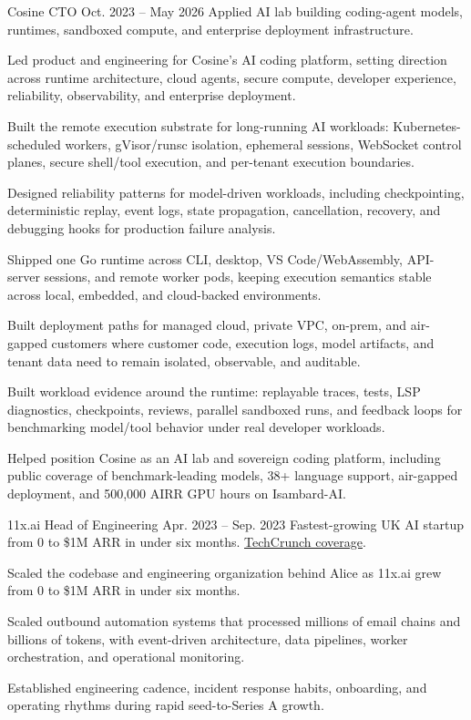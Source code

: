
\ResumeJob
  {Cosine}
  {CTO}
  {Oct. 2023 -- May 2026}
  {Applied AI lab building coding-agent models, runtimes, sandboxed compute, and enterprise deployment infrastructure.}
\begin{ResumeList}
  \item Led product and engineering for Cosine's AI coding platform, setting direction across runtime architecture, cloud agents, secure compute, developer experience, reliability, observability, and enterprise deployment.
  \item Built the remote execution substrate for long-running AI workloads: Kubernetes-scheduled workers, gVisor/runsc isolation, ephemeral sessions, WebSocket control planes, secure shell/tool execution, and per-tenant execution boundaries.
  \item Designed reliability patterns for model-driven workloads, including checkpointing, deterministic replay, event logs, state propagation, cancellation, recovery, and debugging hooks for production failure analysis.
  \item Shipped one Go runtime across CLI, desktop, VS Code/WebAssembly, API-server sessions, and remote worker pods, keeping execution semantics stable across local, embedded, and cloud-backed environments.
  \item Built deployment paths for managed cloud, private VPC, on-prem, and air-gapped customers where customer code, execution logs, model artifacts, and tenant data need to remain isolated, observable, and auditable.
  \item Built workload evidence around the runtime: replayable traces, tests, LSP diagnostics, checkpoints, reviews, parallel sandboxed runs, and feedback loops for benchmarking model/tool behavior under real developer workloads.
  \item Helped position Cosine as an AI lab and sovereign coding platform, including public coverage of benchmark-leading models, 38+ language support, air-gapped deployment, and 500,000 AIRR GPU hours on Isambard-AI.
\end{ResumeList}

\ResumeJob
  {11x.ai}
  {Head of Engineering}
  {Apr. 2023 -- Sep. 2023}
  {Fastest-growing UK AI startup from 0 to \$1M ARR in under six months. \href{https://techcrunch.com/2023/08/11/11xai-closes-2-million-pre-seed-to-create-autonomous-ai-workers/}{TechCrunch coverage}.}
\begin{ResumeList}
  \item Scaled the codebase and engineering organization behind Alice as 11x.ai grew from 0 to \$1M ARR in under six months.
  \item Scaled outbound automation systems that processed millions of email chains and billions of tokens, with event-driven architecture, data pipelines, worker orchestration, and operational monitoring.
  \item Established engineering cadence, incident response habits, onboarding, and operating rhythms during rapid seed-to-Series A growth.
\end{ResumeList}


